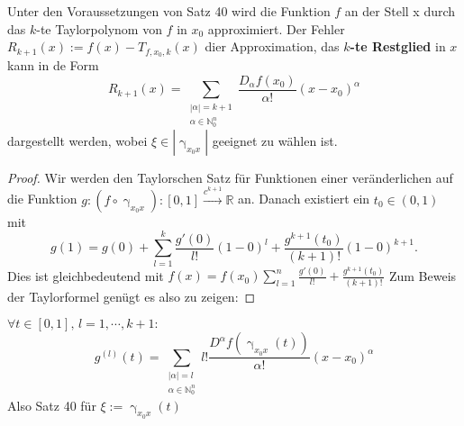 Unter den Voraussetzungen von Satz 40 wird die Funktion $ f $ an der Stell x durch das $ k $-te Taylorpolynom von $ f $ in $ x_0 $ 
approximiert. Der Fehler $ R_{k+1} \left(x\right)  := f \left(x\right) - T_{f, x_0, k} \left(x\right)  $ dier Approximation, das 
\textbf{$ k $-te Restglied} in $ x  $ kann in de Form
$$
R_{k+1}\left(x\right)  =\sum_{ \substack{ |\alpha | = k+1 \\ \alpha \in \mathbb{N} _{0}^{n} }} \frac{D_{\alpha }f \left(x_0\right) }{
\alpha !} \left( x -x_0 \right) ^{\alpha }
$$ dargestellt werden, wobei $ \xi \in  \left| \upgamma_{x_0x}  \right|  $  geeignet zu wählen ist.
\begin{proof}
	Wir werden den Taylorschen Satz für Funktionen einer veränderlichen auf die Funktion $ g: \left( f \circ \upgamma_{x_0x} \right) 
	: [0,1] \xrightarrow{c^{k+1}} \mathbb{R} $ an. Danach existiert ein $ t_0 \in  (0,1) $ mit
	$$
	g (1) = g \left(0\right) + \sum_{l=1}^{k} \frac{g' \left(0\right) }{l !} \left(  1 - 0 \right) ^{l} + \frac{g^{k+1} \left(t_0\right) 
	}{\left( k+1 \right) !} \left( 1-0  \right) ^{k+1}.
	$$
Dies ist gleichbedeutend mit $ f \left(x\right)  = f \left(x_0\right) \sum_{l=1}^{n} \frac{g' \left(0\right) }{l !} + \frac{g^{k+1}
\left(t_0\right) }{\left( k+1 \right) !}  $ Zum Beweis der Taylorformel genügt es also zu zeigen: 
\end{proof}
$ \forall  t \in  [0,1], \, l = 1 , \cdots,  k +1 :  $ 
\begin{equation}
	g^{\left(l\right) } \left(t\right) = \sum_{ \substack{ |\alpha | = l \\ \alpha  \in \mathbb{N}_{0}^{n}}} l! \frac{D^{\alpha}f 
	\left( \upgamma_{x_0x} \left(t\right)  \right) }{\alpha !} \left( x - x_0 \right) ^{\alpha } 
	\tag{1}
\end{equation}
Also Satz 40 für $ \xi := \upgamma_{x_0x} \left(t\right)  $ 
